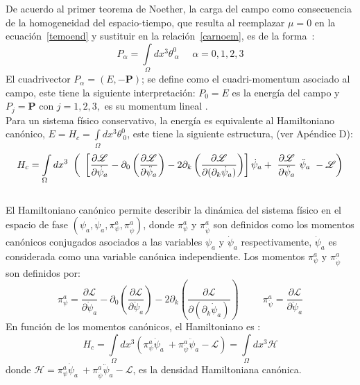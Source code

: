 \documentclass[a4paper,12pt]{article}
\begin{document}
De acuerdo al primer teorema de Noether, la carga del campo como consecuencia de la homogeneidad del espacio-tiempo, que resulta al reemplazar $\mu=0$ en la \mbox{ecuación \eqref{temoend}} y sustituir en la \mbox{relación \eqref{carnoem},} es de la \mbox{forma \cite{ noether, greiner}:}
\begin{equation}
P_{\alpha}=\int\limits_{\Omega}dx^{3}\theta^{0}_{\ \alpha} \ \ \ \ \ \ \alpha=0,1,2,3
\label{cuadri}
\end{equation}
El cuadrivector \mbox{$P_{\alpha}=(E,-\textbf{P})$}; se define como el cuadri-momentum asociado al campo, este tiene la siguiente interpretación: \mbox{$P_{0}=E$} es la energía del campo \mbox{y $P_{j}=\textbf{P}$} con \mbox{$j=1,2,3,$} es su momentum lineal \cite{ noether, greiner, emmy}.
\\

Para un sistema físico conservativo, la energía es equivalente al Hamiltoniano canónico, \mbox{$E=H_c=\int\limits_{\Omega}dx^{3}\theta^{0}_{\ 0}$}, este tiene la siguiente estructura, (ver Apéndice D): 
{\small\begin{equation}
H_c=\int\limits_{\Omega}dx^{3}\ \left(\\\ \left[\frac{\partial \mathscr{L} }{\partial\dot \psi_a}-\partial_{0}\left(\frac{\partial\mathscr{L} }{\partial\ddot \psi_a}  \right)-2\partial_{k}\left(\frac{\partial\mathscr{L} }{\partial(\partial_{k}\dot \psi_a)}  \right) \right] \dot\psi_a +\ \frac{\partial\mathscr{L} }{\partial\ddot \psi_a}\ \ddot\psi_a\ -\mathscr{L}\right) 
\end{equation}}\\
El Hamiltoniano canónico permite describir la dinámica del sistema físico en el espacio de fase $(\psi_a,\dot\psi_a,\pi^{a}_{\psi},\pi^{a}_{\dot\psi})$, donde $\pi^{a}_{\psi}$ y $\pi^{a}_{\dot\psi}$ son definidos como los momentos canónicos conjugados asociados a las variables $\psi_a$ y $\dot\psi_a$ respectivamente, $\dot\psi_a$ es considerada como una variable canónica independiente. Los momentos   
$\pi^{a}_{\psi}$ y $\pi^{a}_{\dot\psi}$ son definidos por:
\begin{equation}
\pi^{a}_{\psi}=\frac{\partial \mathscr{L} }{\partial\dot \psi_a}-\partial_{0}\left(\frac{\partial\mathscr{L} }{\partial\ddot \psi_a}  \right)-2\partial_{k}\left(\frac{\partial\mathscr{L} }{\partial(\partial_{k}\dot \psi_a)}\right)\ \ \ \ \ \ \ \ \ \ \ \pi^{a}_{\dot\psi}=\frac{\partial \mathscr{L} }{\partial\ddot \psi_a} 
\label{mome}
\end{equation}
En función de los momentos canónicos, el Hamiltoniano es \cite{general,podolsky}:
\begin{equation}
H_c=\int\limits_{\Omega}dx^{3}\left(\pi^{a}_{\psi}\dot\psi_a\ +\pi^{a}_{\dot\psi} \ddot\psi_a-\mathscr{L}\right)=\int\limits_{\Omega}dx^{3}\mathscr{H} 
\end{equation}
donde $\mathscr{H}=\pi^{a}_{\psi}\dot\psi_a\ +\pi^{a}_{\dot\psi} \ddot\psi_a-\mathscr{L}$, es la densidad Hamiltoniana canónica.
\\
\end{document}
